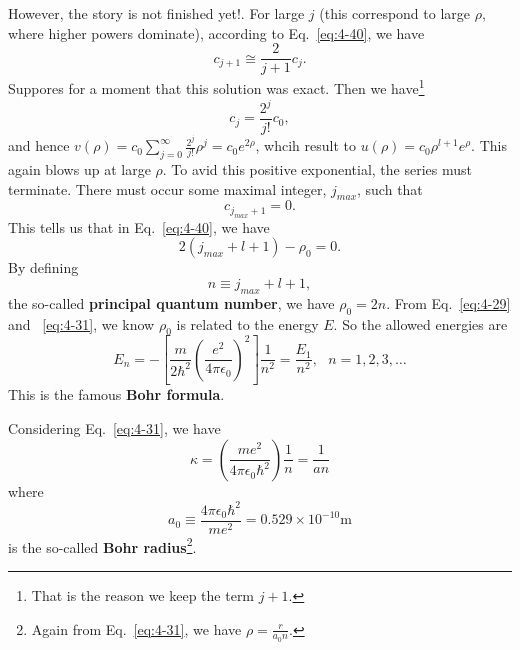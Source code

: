 However, the story is not finished yet!.
For large $j$ (this correspond to large $\rho$, where higher powers dominate), according to Eq.~\eqref{eq:4-40}, we have
\begin{equation*}
  c_{j+1} \cong \frac{2}{j+1} c_{j}.
\end{equation*}
Suppores for a moment that this solution was exact.
Then we have\footnote{That is the reason we keep the term $j+1$.}
\begin{equation}
  \label{eq:4-41}
  c_j= \frac{2^{j}}{j!} c_{0},
\end{equation}
and hence $v \left( \rho \right) = c_0 \sum_{j=0}^{\infty} \frac{2^{j}}{j!} \rho^j = c_0 e^{2\rho}$, whcih result to $u \left( \rho \right) = c_0 \rho^{l+1} e^{\rho}$.
This again blows up at large $\rho$.
To avid this positive exponential, the series must terminate.
There must occur some maximal integer, $j_{max}$, such that
\begin{equation}
  \label{eq:4-42}
  c_{j_{max}+1} = 0.
\end{equation}
This tells us that in Eq.~\eqref{eq:4-40}, we have
\begin{equation*}
  2 \left( j_{max} +l+1 \right) -\rho_0=0.
\end{equation*}
By defining
\begin{equation}
  \label{eq:4-43}
  n \equiv j_{max} + l +1,
\end{equation}
the so-called \textbf{principal quantum number}, we have $\rho_0 = 2n$.
From Eq.~\eqref{eq:4-29} and ~\eqref{eq:4-31}, we know $\rho_0$ is related to the energy $E$.
So the allowed energies are
\begin{equation}
  \label{eq:4-44}
  E_n = - \left[ \frac{m}{2\hbar^{2}} \left( \frac{e^{2}}{4\pi \epsilon_{0}} \right)^2 \right] \frac{1}{n^{2}} = \frac{E_{1}}{n^{2}}, ~ ~ ~ n = 1,2,3,\ldots
\end{equation}
This is the famous \textbf{Bohr formula}.

Considering Eq.~\eqref{eq:4-31}, we have
\begin{equation}
  \label{eq:4-45}
  \kappa = \left( \frac{me^{2}}{4\pi \epsilon_{0} \hbar^{2}} \right) \frac{1}{n} = \frac{1}{an}
\end{equation}
where
\begin{equation}
  \label{eq:4-46}
  a_{0} \equiv \frac{4\pi \epsilon_{0} \hbar^{2}}{m e^{2}} = 0.529 \times 10^{-10} \text{m}
\end{equation}
is the so-called \textbf{Bohr radius}\footnote{Again from Eq.~\eqref{eq:4-31}, we have $\rho = \frac{r}{a_{0} n}$.}.

